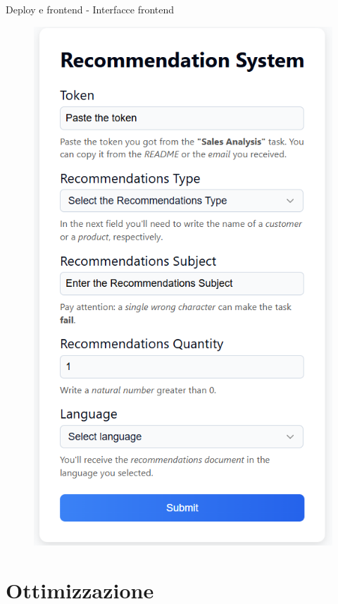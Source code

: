 \documentclass{beamer}
\begin{document}
\begin{frame}{Deploy e frontend - Interfacce frontend}
\begin{figure}
\begin{minipage}{0.2\textwidth}
				\includegraphics[width=\textwidth]{Frontend Recommendation.png}
			\end{minipage}
		\end{figure}
	\end{frame}


	\section{Ottimizzazione}
\end{document}
